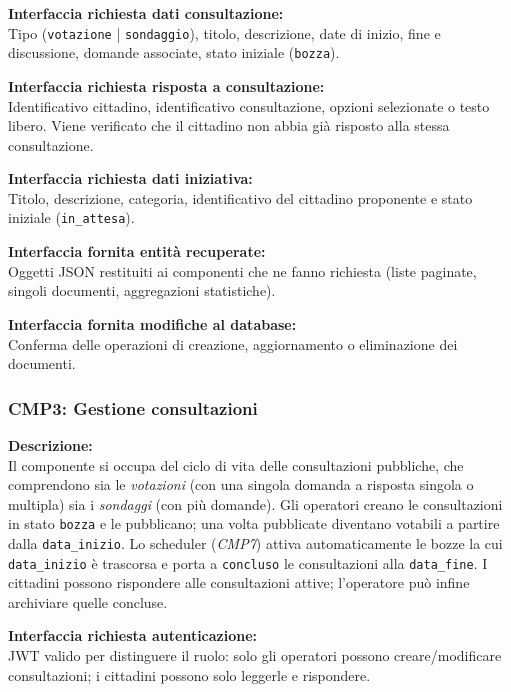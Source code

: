 \documentclass[12pt, a4paper]{article}
\newcommand{\interfacciarichiesta}[1]{\textbf{Interfaccia richiesta #1:}}
\newcommand{\interfacciafornita}[1]{\textbf{Interfaccia fornita #1:}}
\begin{document}
\interfacciarichiesta{dati consultazione}\\
Tipo (\texttt{votazione} | \texttt{sondaggio}), titolo, descrizione, date di inizio, fine e
discussione, domande associate, stato iniziale (\texttt{bozza}).

\interfacciarichiesta{risposta a consultazione}\\
Identificativo cittadino, identificativo consultazione, opzioni selezionate o testo libero. Viene
verificato che il cittadino non abbia già risposto alla stessa consultazione.

\interfacciarichiesta{dati iniziativa}\\
Titolo, descrizione, categoria, identificativo del cittadino proponente e stato iniziale
(\texttt{in\_attesa}).

\interfacciafornita{entità recuperate}\\
Oggetti JSON restituiti ai componenti che ne fanno richiesta (liste paginate, singoli documenti,
aggregazioni statistiche).

\interfacciafornita{modifiche al database}\\
Conferma delle operazioni di creazione, aggiornamento o eliminazione dei documenti.

\subsubsection*{CMP3: Gestione consultazioni}

\textbf{Descrizione:}\\
Il componente si occupa del ciclo di vita delle consultazioni pubbliche, che comprendono sia le
\textit{votazioni} (con una singola domanda a risposta singola o multipla) sia i \textit{sondaggi}
(con più domande). Gli operatori creano le consultazioni in stato \texttt{bozza} e le pubblicano;
una volta pubblicate diventano votabili a partire dalla \texttt{data\_inizio}. Lo scheduler
(\textit{CMP7}) attiva automaticamente le bozze la cui \texttt{data\_inizio} è trascorsa e porta a
\texttt{concluso} le consultazioni alla \texttt{data\_fine}. I cittadini possono rispondere alle
consultazioni attive; l'operatore può infine archiviare quelle concluse.

\interfacciarichiesta{autenticazione}\\
JWT valido per distinguere il ruolo: solo gli operatori possono creare/modificare consultazioni;
i cittadini possono solo leggerle e rispondere.
\end{document}
